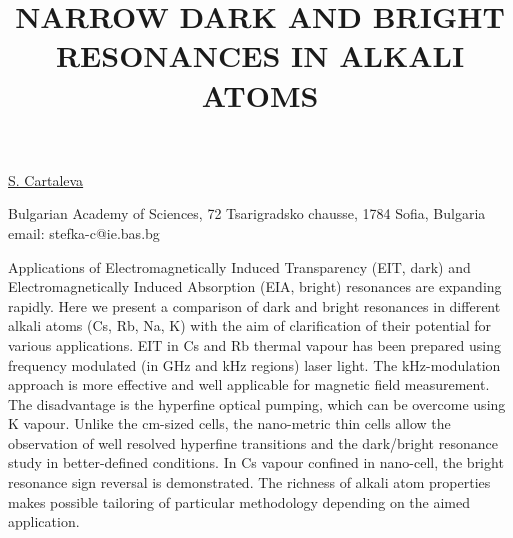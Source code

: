 \title{NARROW DARK AND BRIGHT RESONANCES IN ALKALI ATOMS}

\underline{S. Cartaleva}


Bulgarian Academy of Sciences,
72 Tsarigradsko chausse,
1784 Sofia, Bulgaria\\
email: stefka-c@ie.bas.bg

Applications of Electromagnetically Induced Transparency (EIT, dark) and Electromagnetically Induced Absorption (EIA, bright) resonances are expanding rapidly.
Here we present a comparison of dark and bright resonances in different alkali atoms (Cs, Rb, Na, K) with the aim of clarification of their potential for various applications.
EIT in Cs and Rb thermal vapour has been prepared using frequency modulated (in GHz and kHz regions) laser light. The kHz-modulation approach is more effective and well applicable for magnetic field measurement. The disadvantage is the hyperfine optical pumping, which can be overcome using K vapour.
Unlike the cm-sized cells, the nano-metric thin cells allow the observation of well resolved hyperfine transitions and the dark/bright resonance study in better-defined conditions. In Cs vapour confined in nano-cell, the bright resonance sign reversal is demonstrated.
The richness of alkali atom properties makes possible tailoring of particular methodology depending on the aimed application.

\vspace{\baselineskip}